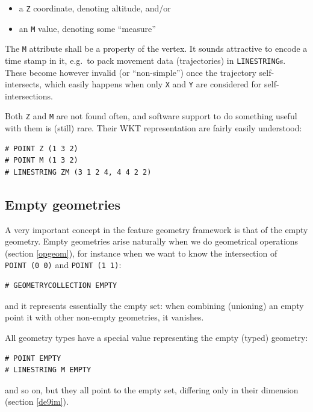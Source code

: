 \documentclass[]{book}
\providecommand{\tightlist}{%
  \setlength{\itemsep}{0pt}\setlength{\parskip}{0pt}}
\begin{document}
\begin{itemize}
\tightlist
\item
  a \texttt{Z} coordinate, denoting altitude, and/or
\item
  an \texttt{M} value, denoting some ``measure''
\end{itemize}

The \texttt{M} attribute shall be a property of the vertex. It sounds
attractive to encode a time stamp in it, e.g.~to pack movement data
(trajectories) in \texttt{LINESTRING}s. These become however invalid (or
``non-simple'') once the trajectory self-intersects, which easily
happens when only \texttt{X} and \texttt{Y} are considered for self-intersections.

Both \texttt{Z} and \texttt{M} are not found often, and software support
to do something useful with them is (still) rare. Their
WKT representation are fairly easily understood:

\begin{verbatim}
# POINT Z (1 3 2)
# POINT M (1 3 2)
# LINESTRING ZM (3 1 2 4, 4 4 2 2)
\end{verbatim}

\hypertarget{empty-geometries}{%
\subsection{Empty geometries}\label{empty-geometries}}

A very important concept in the feature geometry framework is that of the
empty geometry.
Empty geometries arise naturally when we do geometrical
operations (section \ref{opgeom}), for instance when we want to
know the intersection of \texttt{POINT\ (0\ 0)} and \texttt{POINT\ (1\ 1)}:

\begin{verbatim}
# GEOMETRYCOLLECTION EMPTY
\end{verbatim}

and it represents essentially the empty set: when combining
(unioning) an empty point it with other non-empty geometries,
it vanishes.

All geometry types have a special value representing the empty (typed) geometry:

\begin{verbatim}
# POINT EMPTY
# LINESTRING M EMPTY
\end{verbatim}

and so on, but they all point to the empty set, differing only in their
dimension (section \ref{de9im}).
\end{document}
